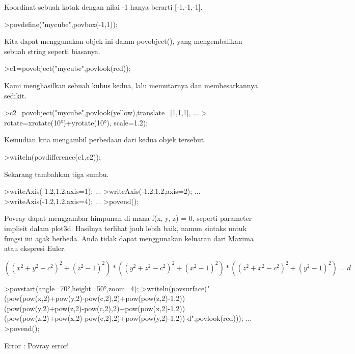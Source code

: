 \documentclass{article}
\begin{document}
\begin{eulernotebook}
\begin{eulercomment}
Koordinat sebuah kotak dengan nilai -1 hanya berarti [-1,-1,-1].
\end{eulercomment}
\begin{eulerprompt}
>povdefine("mycube",povbox(-1,1));
\end{eulerprompt}
\begin{eulercomment}
Kita dapat menggunakan objek ini dalam povobject(), yang mengembalikan
sebuah string seperti biasanya.
\end{eulercomment}
\begin{eulerprompt}
>c1=povobject("mycube",povlook(red));
\end{eulerprompt}
\begin{eulercomment}
Kami menghasilkan sebuah kubus kedua, lalu memutarnya dan
membesarkannya sedikit.
\end{eulercomment}
\begin{eulerprompt}
>c2=povobject("mycube",povlook(yellow),translate=[1,1,1], ...
>  rotate=xrotate(10°)+yrotate(10°), scale=1.2);
\end{eulerprompt}
\begin{eulercomment}
Kemudian kita mengambil perbedaan dari kedua objek tersebut.
\end{eulercomment}
\begin{eulerprompt}
>writeln(povdifference(c1,c2));
\end{eulerprompt}
\begin{eulercomment}
Sekarang tambahkan tiga sumbu.
\end{eulercomment}
\begin{eulerprompt}
>writeAxis(-1.2,1.2,axis=1); ...
>writeAxis(-1.2,1.2,axis=2); ...
>writeAxis(-1.2,1.2,axis=4); ...
>povend();
\end{eulerprompt}
\begin{eulercomment}
Povray dapat menggambar himpunan di mana f(x, y, z) = 0, seperti
parameter implisit dalam plot3d. Hasilnya terlihat jauh lebih baik,
namun sintaks untuk fungsi ini agak berbeda. Anda tidak dapat
menggunakan keluaran dari Maxima atau ekspresi Euler.

\end{eulercomment}
\begin{eulerformula}
\[
((x^2+y^2-c^2)^2+(z^2-1)^2)*((y^2+z^2-c^2)^2+(x^2-1)^2)*((z^2+x^2-c^2)^2+(y^2-1)^2)=d
\]
\end{eulerformula}
\begin{eulerprompt}
>povstart(angle=70°,height=50°,zoom=4);
>writeln(povsurface("(pow(pow(x,2)+pow(y,2)-pow(c,2),2)+pow(pow(z,2)-1,2))(pow(pow(y,2)+pow(z,2)-pow(c,2),2)+pow(pow(x,2)-1,2))(pow(pow(z,2)+pow(x,2)-pow(c,2),2)+pow(pow(y,2)-1,2))-d",povlook(red))); ...
>povend();
\end{eulerprompt}
\begin{euleroutput}
  Error : Povray error!
  

\end{euleroutput}
\end{eulernotebook}
\end{document}
